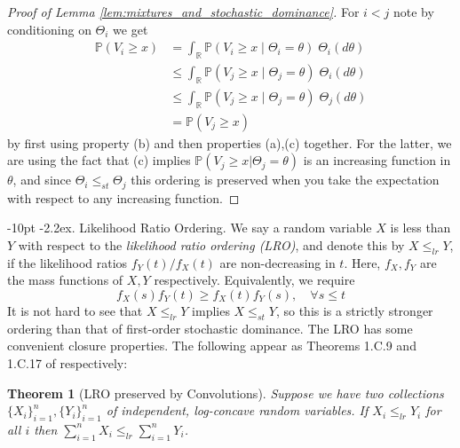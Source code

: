 \documentclass[10pt,oneside,reqno]{article}
\makeatletter
\theoremstyle{plain}
\newtheorem{theorem}{Theorem}[section]
\theoremstyle{definition}
\numberwithin{equation}{section}
\def\subsubsection#1{\@startsection{subsubsection}{3}{0pt}%
{\medskipamount}%
{-10pt}%
{\normalsize\itshape}{\kern-2.2ex. #1.}}
\renewcommand{\cite}{\citep}
\renewcommand{\leq}{\leqslant}
\renewcommand{\geq}{\geqslant}
\newcommand{\R}{\mathbb{R}}
\renewcommand{\P}{\mathbb{P}}
\makeatother
\begin{document}
\begin{proof}[Proof of Lemma \ref{lem:mixtures_and_stochastic_dominance}]
    For $i < j$ note by conditioning on $\Theta_i$ we get
    \begin{align*}
        \P(V_i \geq x) & = \int_\R \P(V_i \geq x \; | \; \Theta_i = \theta) \; \Theta_i(d\theta) \\
        & \leq \int_\R \P(V_j \geq x \; | \; \Theta_j = \theta) \; \Theta_i(d\theta)\\
        & \leq \int_\R \P(V_j \geq x \; | \; \Theta_j = \theta) \; \Theta_j(d\theta) \\
        & = \P(V_j \geq x)
    \end{align*}    
    \noindent by first using property (b) and then properties (a),(c) together. For the latter, we are using the fact that (c) implies $\P(V_j \geq x | \Theta_j = \theta)$ is an increasing function in $\theta$, and since $\Theta_i \leq_{st} \Theta_j$ this ordering is preserved when you take the expectation with respect to any increasing function.  
    \end{proof}

    \subsubsection{Likelihood Ratio Ordering}
    \label{app:likelihood-ratio-ordering}
    We say a random variable $X$ is less than $Y$ with respect to the \textit{likelihood ratio ordering (LRO)}, and denote this by $X \leq_{lr} Y$,  if the likelihood ratios $f_Y(t)/f_X(t)$ are non-decreasing in $t$. Here, $f_X, f_Y$ are the mass functions of $X,Y$ respectively. Equivalently, we require
    \[f_X(s)f_Y(t) \geq f_X(t)f_Y(s), \quad \forall s \leq t\]
    \noindent It is not hard to see that $X \leq_{lr} Y$ implies $X \leq_{st} Y$, so this is a strictly stronger ordering than that of first-order stochastic dominance. The LRO has some convenient closure properties. The following appear as Theorems 1.C.9 and 1.C.17 of \cite{shaked2007stochastic_orderings} respectively:

    \begin{theorem}[LRO preserved by Convolutions]
        Suppose we have two collections $\{X_i\}_{i=1}^n, \{Y_i\}_{i=1}^n$ of independent, log-concave random variables. If $X_i \leq_{lr} Y_i$ for all $i$ then $\sum_{i=1}^n X_i \leq_{lr} \sum_{i=1}^n Y_i$.
        \label{thm:convolutions_and_likelihood_ratio_order}
    \end{theorem}
\end{document}

